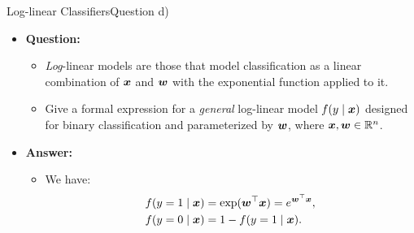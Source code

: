 \documentclass[t]{beamer}
\begin{document}
\begin{frame}{Log-linear Classifiers}{Question d)}
    \begin{itemize}
        \item \textbf{Question:}
              \begin{itemize}
                  \item \emph{Log}-linear models are those that model
                        classification as a linear combination of ${\boldsymbol{x}}$ and
                        ${\boldsymbol{w}}$ with the exponential function applied to it.
                  \item Give a formal expression for a \emph{general} log-linear
                        model $f(y\mid{\boldsymbol{x}})$ designed for binary classification
                        and parameterized by ${\boldsymbol{w}}$, where ${\boldsymbol{x}},{\boldsymbol{w}}\in\mathbb{R}^n$.
              \end{itemize}
              \pause
        \item \textbf{Answer:}
              \begin{itemize}
                  \item We have:
                        \begin{align}
                            f(y=1\mid{\boldsymbol{x}}) & = \exp({\boldsymbol{w}}^\top{\boldsymbol{x}}) = e^{{\boldsymbol{w}}^\top{\boldsymbol{x}}}, \\
                            f(y=0\mid{\boldsymbol{x}}) & = 1 - f(y=1\mid{\boldsymbol{x}}).
                        \end{align}
              \end{itemize}
    \end{itemize}
\end{frame}
\end{document}
